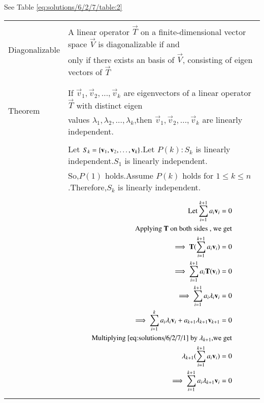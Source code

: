 See Table     \ref{eq:solutions/6/2/7/table:2}

\onecolumn
\begin{longtable}{|l|l|}
	\hline
	\multirow{3}{*}{Diagonalizable} 
	& \\
	& A linear operator $\vec{T}$ on a finite-dimensional vector space $\vec{V}$ is diagonalizable if and\\
    &only if there exists an basis of $\vec{V}$, consisting of eigen vectors of $\vec{T}$ \\ 
	&\\
	\hline
	\multirow{3}{*}{Theorem}
	& \\
&If $\vec{v}_1,\vec{v}_2,\dots,\vec{v}_k$ are eigenvectors of a linear operator $\vec{T}$ with distinct eigen\\
& values $\lambda_1,\lambda_2,\dots,\lambda_k$,then $\vec{v}_1,\vec{v}_2,\dots,\vec{v}_k$ are linearly independent.\\
&\\
&Let $S_k=\cbrak{\vec{v}_1,\vec{v}_2,\dots,\vec{v}_k}$.Let $P(k): S_k$ is linearly independent.$S_1$ is linearly independent.\\
&So,$P(1)$ holds.Assume $P(k)$ holds for $1 \le k \le n$.Therefore,$S_k$ is linearly independent.\\
&\parbox{10cm}{\begin{align}
\text{Let} \sum_{i=1}^{k+1} a_i\vec{v}_i = 0 \label{eq:solutions/6/2/7/1}\\
\text{Applying $\vec{T}$ on both sides , we get} \nonumber\\
\implies \vec{T}(\sum_{i=1}^{k+1} a_i\vec{v}_i)=0\\
\implies \sum_{i=1}^{k+1}a_i\vec{T}(\vec{v}_i)=0\\
\implies \sum_{i=1}^{k+1}a_i\lambda_i\vec{v}_i=0\\
\implies\sum_{i=1}^{k}a_i\lambda_i\vec{v}_i+a_{k+1}\lambda_{k+1}\vec{v}_{k+1}=0
\label{eq:solutions/6/2/7/2}\\
\text{Multiplying \eqref{eq:solutions/6/2/7/1} by $\lambda_{k+1}$,we get} \nonumber\\
\lambda_{k+1}(\sum_{i=1}^{k+1} a_i\vec{v}_i)=0\\
\implies \sum_{i=1}^{k+1}a_i\lambda_{k+1}\vec{v}_i=0
\end{align}}\\
\hline
&\parbox{10cm}{\begin{align}
\implies\sum_{i=1}^{k}a_i\lambda_{k+1}\vec{v}_i+a_{k+1}\lambda_{k+1}\vec{v}_{k+1}=0\label{eq:solutions/6/2/7/3}\\

\end{align}}
\end{longtable}
